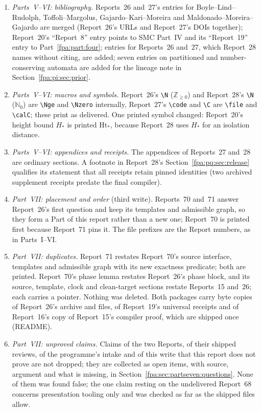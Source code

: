\documentclass[11pt,a4paper]{article}
\numberwithin{equation}{section}
\newcommand{\N}{\mathbb N}\newcommand{\Z}{\mathbb Z}\newcommand{\R}{\mathbb R}
\newcommand{\code}[1]{\texttt{\small #1}}
\newcommand{\Nge}{\mathbb Z_{\ge0}}\newcommand{\Nzero}{\mathbb N_0}
\newcommand{\file}[1]{\texttt{\detokenize{#1}}}
\newcommand{\calC}{\mathcal C}\newcommand{\gebit}{\operatorname{ge}}\newcommand{\bitlen}{\operatorname{bits}}
\begin{document}
\begin{enumerate}
\item \emph{Parts~V--VI: bibliography.} Reports~26 and~27's entries for Boyle--Lind--Rudolph, Toffoli--Margolus, Gajardo--Kari--Moreira and Maldonado--Moreira--Gajardo are merged (Report~26's URLs and Report~27's DOIs together); Report~20's ``Report~8'' entry points to SMC Part~IV and its ``Report~19'' entry to Part~\ref{fpa:part:four}; entries for Reports~26 and~27, which Report~28 names without citing, are added; seven entries on partitioned and number-conserving automata are added for the lineage note in Section~\ref{fpa:pi:sec:prior}.
\item \emph{Parts~V--VI: macros and symbols.} Report~26's \verb|\N| ($\mathbb Z_{\ge0}$) and Report~28's \verb|\N| ($\mathbb N_0$) are \verb|\Nge| and \verb|\Nzero| internally, Report~27's \verb|\code| and \verb|\C| are \verb|\file| and \verb|\calC|; these print as delivered. One printed symbol changed: Report~20's height bound $H_*$ is printed $\mathrm{Ht}_*$, because Report~28 uses $H_*$ for an isolation distance.
\item \emph{Parts~V--VI: appendices and receipts.} The appendices of Reports~27 and~28 are ordinary sections. A footnote in Report~28's Section~\ref{fpa:pq:sec:release} qualifies its statement that all receipts retain pinned identities (two archived supplement receipts predate the final compiler).
\item \emph{Part~VII: placement and order} (third write). Reports~70 and~71 answer Report~26's first question and keep its templates and admissible graph, so they form a Part of this report rather than a new one; Report~70 is printed first because Report~71 pins it. The file prefixes are the Report numbers, as in Parts~I--VI.
\item \emph{Part~VII: duplicates.} Report~71 restates Report~70's source interface, templates and admissible graph with its new exactness predicate; both are printed. Report~70's phase lemma restates Report~26's phase block, and its source, template, clock and clean-target sections restate Reports~15 and~26; each carries a pointer. Nothing was deleted. Both packages carry byte copies of Report~26's archive and files, of Report~19's universal receipts and of Report~16's copy of Report~15's compiler proof, which are shipped once (README).
\item \emph{Part~VII: unproved claims.} Claims of the two Reports, of their shipped reviews, of the programme's intake and of this write that this report does not prove are not dropped; they are collected as open items, with source, argument and what is missing, in Section~\ref{fpa:sec:partseven:questions}. None of them was found false; the one claim resting on the undelivered Report~68 concerns presentation tooling only and was checked as far as the shipped files allow.

\end{enumerate}
\end{document}
